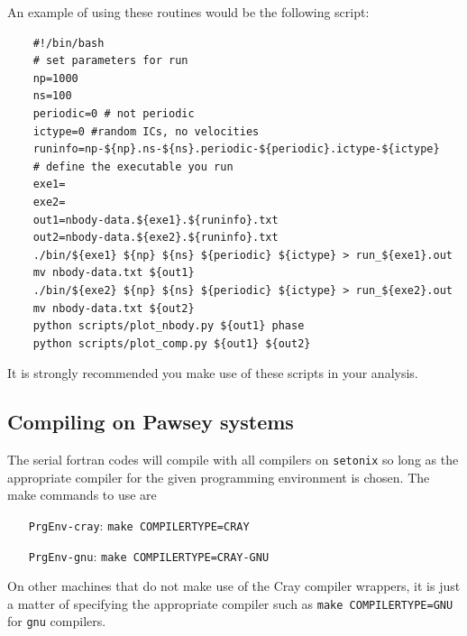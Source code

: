 An example of using these routines would be the following script:
\begin{center}
\begin{minipage}{0.95\textwidth}
\small
\begin{verbatim}
    #!/bin/bash
    # set parameters for run 
    np=1000
    ns=100
    periodic=0 # not periodic
    ictype=0 #random ICs, no velocities
    runinfo=np-${np}.ns-${ns}.periodic-${periodic}.ictype-${ictype}
    # define the executable you run 
    exe1=
    exe2=
    out1=nbody-data.${exe1}.${runinfo}.txt 
    out2=nbody-data.${exe2}.${runinfo}.txt 
    ./bin/${exe1} ${np} ${ns} ${periodic} ${ictype} > run_${exe1}.out
    mv nbody-data.txt ${out1}
    ./bin/${exe2} ${np} ${ns} ${periodic} ${ictype} > run_${exe2}.out
    mv nbody-data.txt ${out2}
    python scripts/plot_nbody.py ${out1} phase 
    python scripts/plot_comp.py ${out1} ${out2}
\end{verbatim}
\end{minipage}
\end{center}

\par 
It is strongly recommended you make use of these scripts in your analysis.

\subsection{Compiling on Pawsey systems}
The serial fortran codes will compile with all compilers on \texttt{setonix} so long as the appropriate compiler for the given programming environment is chosen. The make commands to use are 
\begin{itemize}
    \setlength{\itemindent}{70pt}
    \item[\texttt{PrgEnv-cray}:\quad]{\texttt{make COMPILERTYPE=CRAY}}
    \item[\texttt{PrgEnv-gnu}:\quad]{\texttt{make COMPILERTYPE=CRAY-GNU}}
\end{itemize}
On other machines that do not make use of the Cray compiler wrappers, it is just a matter of specifying the appropriate compiler such as \texttt{make COMPILERTYPE=GNU} for \texttt{gnu} compilers.
